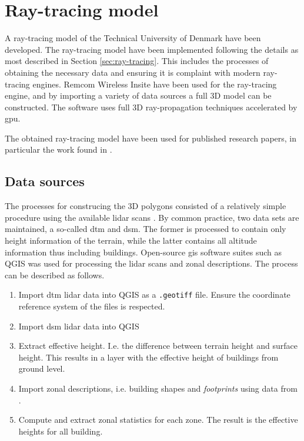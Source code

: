 \chapter{Ray-tracing model}\label{app:ray_tracing_model}

A ray-tracing model of the Technical University of Denmark have been developed. The ray-tracing model have been implemented following the details as most described in Section \ref{sec:ray-tracing}. This includes the processes of obtaining the necessary data and ensuring it is complaint with modern ray-tracing engines. Remcom Wireless Insite \cite{remcom} have been used for the ray-tracing engine, and by importing a variety of data sources a full 3D model can be constructed. The software uses full 3D ray-propagation techniques accelerated by \gls{gpu}.

The obtained ray-tracing model have been used for published research papers, in particular the work found in \cite{Thrane2019ComparisonGHz, Thrane020ModelAidedDeepLearning, Thrane2020DeepKnowledge}.

\section{Data sources}

The processes for construcing the 3D polygons consisted of a relatively simple procedure using the available \gls{lidar} scans \cite{kortforsyningen}. By common practice, two data sets are maintained, a so-called \gls{dtm} and \gls{dsm}. The former is processed to contain only height information of the terrain, while the latter contains all altitude information thus including buildings. Open-source \gls{gis} software suites such as QGIS \cite{QGISDevelopmentTeam2020QGISSystem} was used for processing the \gls{lidar} scans and zonal descriptions. The process can be described as follows. 
\begin{enumerate}
    \item Import \gls{dtm} \gls{lidar} data into QGIS as a \texttt{.geotiff} file. Ensure the coordinate reference system of the files is respected.
    \item Import \gls{dsm} \gls{lidar} data into QGIS
    \item Extract effective height. I.e. the difference between terrain height and surface height. This results in a layer with the effective height of buildings from ground level.
    \item Import zonal descriptions, i.e. building shapes and \emph{footprints} using data from \cite{OpenstreetMapWiki}.
    \item Compute and extract zonal statistics for each zone. The result is the effective heights for all building.
\end{enumerate}


